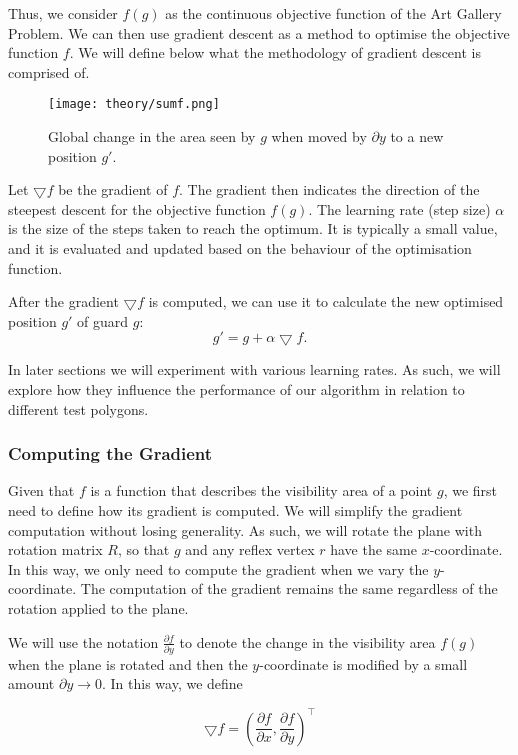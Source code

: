 Thus, we consider $f(g)$ as the continuous objective function of the Art Gallery Problem. We can then use gradient descent as a method to optimise the objective function $f$. We will define below what the methodology of gradient descent is comprised of.

\begin{figure}[h!]
    \centering
    \texttt{[image: theory/sumf.png]}
    \caption{Global change in the area seen by $g$ when moved by $\partial y$ to a new position $g'$.}
    \label{fig:sumf}
\end{figure}


Let $\bigtriangledown f$ be the gradient of $f$. The gradient then indicates the direction of the steepest descent for the objective function $f(g)$.
The learning rate (step size) $\alpha$ is the size of the steps taken to reach the optimum. It is typically a small value, and it is evaluated and updated based on the behaviour of the optimisation function. 

After the gradient $\bigtriangledown f$ is computed, we can use it to calculate the new optimised position $g'$ of guard $g$: $$g' = g + \alpha\bigtriangledown f.$$


In later sections we will experiment with various learning rates. As such, we will explore how they influence the performance of our algorithm in relation to different test polygons. 

\newpage
\subsubsection{Computing the Gradient}

Given that $f$ is a function that describes the visibility area of a point $g$, we first need to define how its gradient is computed. We will simplify the gradient computation without losing generality. As such, we will rotate the plane with rotation matrix $R$, so that $g$ and any reflex vertex $r$ have the same $x$-coordinate. In this way, we only need to compute the gradient when we vary the $y$-coordinate. The computation of the gradient remains the same regardless of the rotation applied to the plane.


We will use the notation $\frac{\partial f}{\partial y}$ to denote the change in the visibility area $f(g)$ when the plane is rotated and then the $y$-coordinate is modified by a small amount $\partial y \rightarrow 0$. In this way, we define 

\begin{equation}
    \bigtriangledown f = \left(\frac{\partial f}{\partial x}, \frac{\partial f}{\partial y}\right)^\intercal \label{eq:gradient}
\end{equation}

